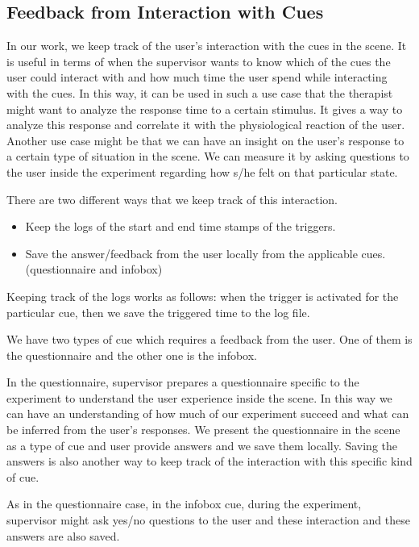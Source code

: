 \documentclass[conference]{IEEEtran}
\begin{document}
\subsection{Feedback from Interaction with Cues}

In our work, we keep track of the user's interaction with the cues in the scene. It is useful in terms of when the supervisor wants to know which of the cues the user could interact with and how much time the user spend while interacting with the cues. In this way, it can be used in such a use case that the therapist might want to analyze the response time to a certain stimulus. It gives a way to analyze this response and correlate it with the physiological reaction of the user. Another use case might be that we can have an insight on the user's response to a certain type of situation in the scene. We can measure it by asking questions to the user inside the experiment regarding how s/he felt on that particular state. 

There are two different ways that we keep track of this interaction. 
\begin{itemize}
    \item Keep the logs of the start and end time stamps of the triggers.
    \item Save the answer/feedback from the user locally from the applicable cues. (questionnaire and infobox)
\end{itemize}

Keeping track of the logs works as follows: when the trigger is activated for the particular cue, then we save the triggered time to the log file. 

We have two types of cue which requires a feedback from the user. One of them is the questionnaire and the other one is the infobox. 

In the questionnaire, supervisor prepares a questionnaire specific to the experiment to understand the user experience inside the scene. In this way we can have an understanding of how much of our experiment succeed and what can be inferred from the user's responses. We present the questionnaire in the scene as a type of cue and user provide answers and we save them locally. Saving the answers is also another way to keep track of the interaction with this specific kind of cue.

As in the questionnaire case, in the infobox cue, during the experiment, supervisor might ask yes/no questions to the user and these interaction and these answers are also saved. 
\end{document}
